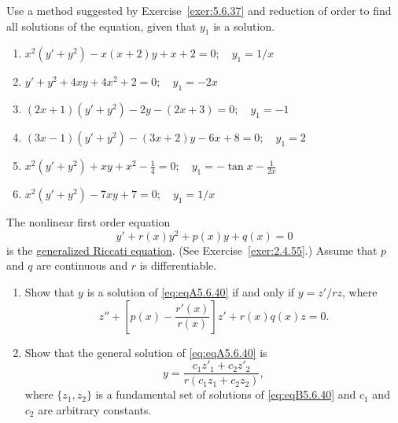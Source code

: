 \documentclass{ximera}
\begin{document}
\begin{problem}\label{exer:5.6.39}
Use a method suggested by Exercise~\ref{exer:5.6.37} and reduction of
order to find all solutions of the equation, given that $y_1$ is
a solution.

\begin{enumerate}
\item %
$x^2(y'+y^2)-x(x+2)y+x+2=0;  \quad y_1=1/x$

\item %
$y'+y^2+4xy+4x^2+2=0;   \quad y_1=-2x$

\item %
$(2x+1)(y'+y^2)-2y-(2x+3)=0;   \quad y_1=-1$

\item %
$(3x-1)(y'+y^2)-(3x+2)y-6x+8=0;   \quad y_1=2$

\item %
$x^2(y'+y^2)+xy+x^2-\frac{1}{4}=0;
\quad y_1=-\tan x -\frac{1}{2x}$

\item %
$x^2(y'+y^2)-7xy+7=0;  \quad y_1=1/x$

\end{enumerate}
\end{problem}

\begin{problem}\label{exer:5.6.40}
The nonlinear first order equation
\begin{equation}\label{eq:eqA5.6.40}
 y'+r(x)y^2+p(x)y+q(x)=0
\end{equation}
is the
\href{http://http://www-history.mcs.st-and.ac.uk/Indexes/Riccati.html}
{generalized Riccati equation}.
(See Exercise~\ref{exer:2.4.55}.)
Assume that $p$ and $q$ are continuous and $r$ is differentiable.

\begin{enumerate}
\item %
Show that $y$ is a solution of \ref{eq:eqA5.6.40} if and only if
 $y={z'/rz}$,  where \begin{equation}\label{eq:eqB5.6.40}
z''+\left[p(x)-\frac{r'(x)}{r(x)}\right]
z'+r(x)q(x)z=0.
\end{equation}

\item %
 Show that the general solution of \ref{eq:eqA5.6.40} is
$$
 y=\frac{c_1z'_1+c_2z'_2}{r(c_1z_1+c_2z_2)},
$$
where $\{z_1,z_2\}$ is a fundamental set of solutions of
\ref{eq:eqB5.6.40} and $c_1$ and $c_2$ are arbitrary constants.
\end{enumerate}
\end{problem}
\end{document}
